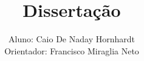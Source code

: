 \documentclass[a4paper,11pt]{book}
\begin{document}
 

\author{Aluno: Caio De Naday Hornhardt\\ Orientador: Francisco
  Miraglia Neto} 
\title{Disserta\c c\~ao}


% 


% 
%
%
%

% 
% 
\end{document}
